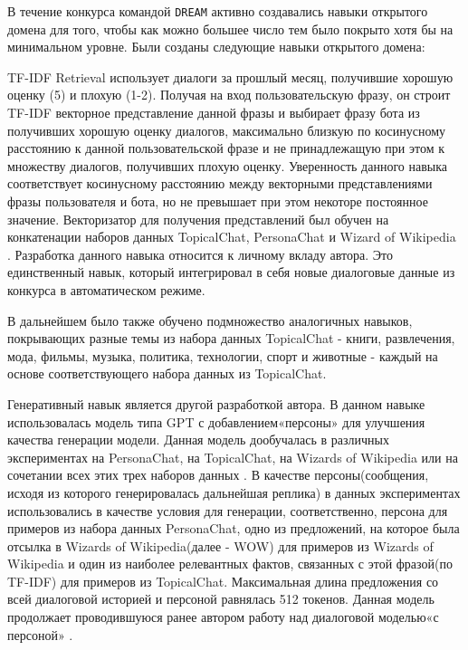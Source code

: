 В течение конкурса командой \texttt{DREAM} активно создавались навыки открытого домена для того, чтобы как можно большее число тем было покрыто хотя бы на минимальном уровне. Были созданы следующие навыки открытого домена:

TF-IDF Retrieval использует диалоги за прошлый месяц, получившие хорошую оценку (5) и плохую (1-2). Получая на вход пользовательскую фразу, он строит TF-IDF векторное представление данной фразы и выбирает фразу бота из получивших хорошую оценку диалогов, максимально близкую по косинусному расстоянию к данной пользовательской фразе и не принадлежащую при этом к множеству диалогов, получивших плохую оценку. Уверенность данного навыка соответствует косинусному расстоянию между векторными представлениями фразы пользователя и бота, но не превышает при этом некоторе постоянное значение. Векторизатор для получения представлений был обучен на конкатенации наборов данных TopicalChat\cite{topicalchat}, PersonaChat \cite{personachat} и Wizard of Wikipedia \cite{wow}. Разработка данного навыка относится к личному вкладу автора.  Это единственный навык, который интегрировал в себя новые диалоговые данные из конкурса в автоматическом режиме.

В дальнейшем было также обучено подмножество аналогичных навыков, покрывающих разные темы из набора данных TopicalChat  - книги, развлечения, мода, фильмы, музыка, политика, технологии, спорт и животные - каждый на основе соответствующего набора данных из TopicalChat.

Генеративный навык является другой разработкой автора. В данном навыке использовалась модель типа GPT\cite{radford_2018_gpt} с добавлением«персоны» для улучшения качества генерации модели. Данная модель дообучалась в различных экспериментах на PersonaChat, на TopicalChat, на Wizards of Wikipedia или на сочетании всех этих трех наборов данных . В качестве персоны(сообщения, исходя из которого генерировалась дальнейшая реплика) в данных экспериментах использовались в качестве условия для генерации, соответственно, персона для примеров из набора данных PersonaChat, одно из предложений, на которое была отсылка в Wizards of Wikipedia(далее - WOW) для примеров из Wizards of Wikipedia и один из наиболее релевантных фактов, связанных с этой фразой(по TF-IDF) для примеров из TopicalChat. Максимальная длина предложения со всей диалоговой историей и персоной равнялась 512 токенов.  Данная модель продолжает проводившуюся ранее автором работу над диалоговой моделью«с персоной» \cite{Болотин_Карпов_Рашков_Шкурак_2019}.

